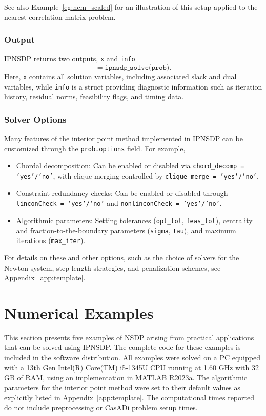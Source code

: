 \documentclass[]{interact}
\theoremstyle{plain}%
\theoremstyle{definition}
\theoremstyle{remark}
\begin{document}
See also Example~\ref{eg:ncm_scaled} for an illustration of this setup applied to the nearest correlation matrix problem.

\subsubsection{Output}\label{sec:output}
IPNSDP returns two outputs, \texttt{x} and \texttt{info}
\begin{equation*}
    [\texttt{x}, \texttt{info}] = \texttt{ipnsdp\_solve(prob)}.
\end{equation*}
Here, \texttt{x} contains all solution variables, including associated slack and dual variables, while \texttt{info} is a struct providing diagnostic information such as iteration history, residual norms, feasibility flags, and timing data.

\subsubsection{Solver Options}\label{sec:options}
Many features of the interior point method implemented in IPNSDP can be customized through the \texttt{prob.options} field. For example,

\begin{itemize}
\item Chordal decomposition: Can be enabled or disabled via \texttt{chord\_decomp = 'yes'/'no'}, with clique merging controlled by \texttt{clique\_merge = 'yes'/'no'}.
\item Constraint redundancy checks: Can be enabled or disabled through\\ \texttt{linconCheck = 'yes'/'no'} and \texttt{nonlinconCheck = 'yes'/'no'}.
\item Algorithmic parameters: Setting tolerances (\texttt{opt\_tol}, \texttt{feas\_tol}), centrality and fraction-to-the-boundary parameters (\texttt{sigma}, \texttt{tau}), and maximum iterations (\texttt{max\_iter}).
\end{itemize}

For details on these and other options, such as the choice of solvers for the Newton system, step length strategies, and penalization schemes, see Appendix~\ref{app:template}.

\section{Numerical Examples}\label{sec:eg}
This section presents five examples of NSDP arising from practical applications that can be solved using IPNSDP. The complete code for these examples is included in the software distribution.  All examples were solved on a PC equipped with a 13th
Gen Intel(R) Core(TM) i5-1345U CPU running at 1.60 GHz
with 32 GB of RAM, using an implementation in MATLAB R2023a. The algorithmic parameters for the interior point method were set to their default values as explicitly listed in Appendix~\ref{app:template}. The computational times reported do not include preprocessing or CasADi problem setup times.
\end{document}
